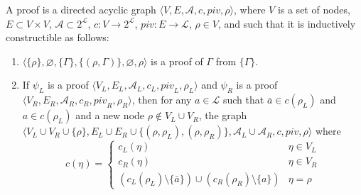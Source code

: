 \documentclass{llncs}
\newcommand{\dual}[1]{{\ensuremath{\bar{#1}}}}
\begin{document}
\newcommand{\clause}{c}
\newcommand{\pivot}{\mathit{piv}}

\begin{definition}[Proof] \label{def:proof}
A proof is a directed acyclic graph
$\langle 
V, 
E, 
\mathcal{A},
\clause, 
\pivot, 
\rho
\rangle$, 
where $V$ is a set of nodes, $E \subset V \times V$, 
$\mathcal{A} \subset 2^\mathcal{L}$,
$\clause : V \longrightarrow 2^\mathcal{L}$, 
$\pivot : E \longrightarrow \mathcal{L}$, 
$\rho \in V$, and such that it is inductively constructible as follows:
\begin{enumerate}
  \item $\langle \{\rho\}, \varnothing, \{ \Gamma \}, \{ (\rho, \Gamma) \}, \varnothing,  \rho \rangle$ 
    is a proof of $\Gamma$ from $\{ \Gamma \}$.
  \item If $\psi_L$ is a proof $\langle V_L, E_L, \mathcal{A}_L, \clause_L, \pivot_L, \rho_L \rangle$ and
    $\psi_R$ is a proof $\langle V_R, E_R, \mathcal{A}_R, \clause_R, \pivot_R, \rho_R \rangle$, then for any $a \in \mathcal{L}$ such that $\dual{a} \in \clause(\rho_L)$ and $a
    \in \clause(\rho_L)$ and a new node $\rho \notin V_L \cup V_R$, the graph 
    $\langle 
    V_L \cup V_R \cup \{\rho\},
    E_L \cup E_R \cup \{(\rho,\rho_L),(\rho,\rho_R)\}, 
    \mathcal{A}_L \cup \mathcal{A}_R,
    \clause, 
    \pivot, 
    \rho
    \rangle$ where
    \begin{equation*}
      \clause(\eta) = \begin{cases}
        \clause_L(\eta) & \eta \in V_L \\
        \clause_R(\eta) & \eta \in V_R \\
        (\clause_L(\rho_L) \setminus \{\dual{a}\}) \cup (\clause_R(\rho_R) \setminus \{a\}) &
          \eta = \rho
      \end{cases}
    \end{equation*}

\end{enumerate}
\end{definition}
\end{document}
